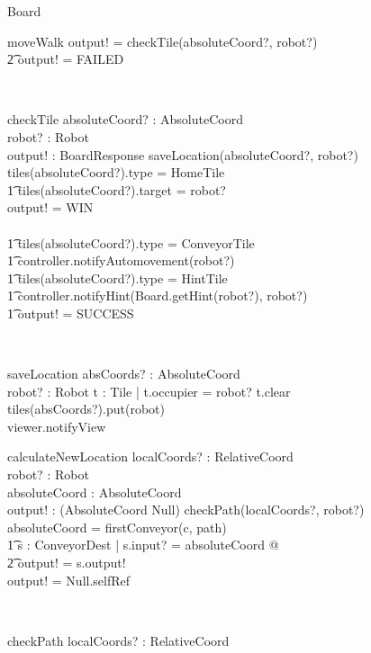 \documentclass[12pt]{article}
\begin{document}
\begin{class}{Board}
\begin{schema}{moveWalk}
\ELSE output! = checkTile(absoluteCoord?, robot?)\\ \t2
\ELSE output! = FAILED
\end{schema} \\
\begin{schema}{checkTile}
absoluteCoord? : AbsoluteCoord \\
robot? : Robot \\
output! : BoardResponse
\where
saveLocation(absoluteCoord?, robot?) \\
\IF tiles(absoluteCoord?).type = HomeTile \\ \t1
tiles(absoluteCoord?).target = robot? \\
\THEN output! = WIN \\ \
\ELSE  \\ \t1
\IF tiles(absoluteCoord?).type = ConveyorTile \\ \t1
\THEN controller.notifyAutomovement(robot?) \\ \t1
\IF tiles(absoluteCoord?).type = HintTile \\ \t1
\THEN controller.notifyHint(Board.getHint(robot?), robot?) \\ \t1
output! = SUCCESS
\end{schema} \\
\begin{schema}{saveLocation}
absCoords? : AbsoluteCoord \\
robot? : Robot
\where
\exists t : Tile | t.occupier = robot? \wedge t.clear\\
tiles(absCoords?).put(robot) \\
viewer.notifyView
\end{schema}
\znewpage
\begin{schema}{calculateNewLocation}
localCoords? : RelativeCoord \\
robot? : Robot \\
absoluteCoord : AbsoluteCoord \\
output! : (AbsoluteCoord \union Null)
\where
\IF checkPath(localCoords?, robot?) \\
\THEN absoluteCoord = firstConveyor(c, path) \\ \t1
\exists s : ConveyorDest | s.input? = absoluteCoord @ \\ \t2
output! = s.output! \\
\ELSE output! = Null.selfRef
\end{schema} \\
\begin{schema}{checkPath}
localCoords? : RelativeCoord \\

\end{schema}
\end{class}
\end{document}
